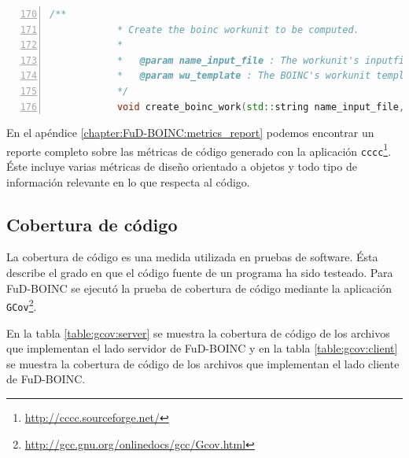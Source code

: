 \begin{lstlisting}[frame=shadowbox, language=C++, numbers=left, xleftmargin=8mm, framexleftmargin=22pt, basicstyle=\scriptsize, numberstyle=\footnotesize, breaklines=true, breakatwhitespace=false, caption={Ejemplo de comentario Doxygen utilizado en FuD-BOINC}, label=listing:fud:doxygen, backgroundcolor=\color{gris}, firstnumber=170, tabsize=4, keywordstyle=\color{Blue}]
            /** 
            * Create the boinc workunit to be computed.
            *
            *   @param name_input_file : The workunit's inputfile name
            *   @param wu_template : The BOINC's workunit template
            */
            void create_boinc_work(std::string name_input_file, const char* wu_template) throw (BoincWorkException);
\end{lstlisting}

En el apéndice \ref{chapter:FuD-BOINC:metrics_report} podemos encontrar un reporte completo sobre las métricas de código generado con la aplicación \texttt{cccc}\footnote{\url{http://cccc.sourceforge.net/}}. Éste incluye varias métricas de diseño orientado a objetos y todo tipo de información relevante en lo que respecta al código.

\subsection{Cobertura de código}

La cobertura de código es una medida utilizada en pruebas de software. Ésta describe el grado en que el código fuente de un programa ha sido testeado. Para FuD-BOINC se ejecutó la prueba de cobertura de código mediante la aplicación \texttt{GCov}\footnote{\url{http://gcc.gnu.org/onlinedocs/gcc/Gcov.html}}.

En la tabla \ref{table:gcov:server} se muestra la cobertura de código de los archivos que implementan el lado servidor de FuD-BOINC y en la tabla \ref{table:gcov:client} se muestra la cobertura de código de los archivos que implementan el lado cliente de FuD-BOINC.

